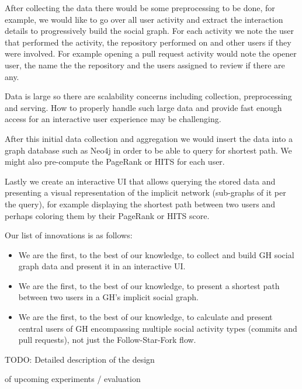 \documentclass[sigconf,11pt]{acmart}
\begin{document}
After collecting the data there would be some preprocessing to be done, for example, we would like to go over all user
activity and extract the interaction details to progressively build the social graph.
For each activity we note the user that performed the activity, the repository performed on and other users if
they were involved.
For example opening a pull request activity would note the opener user, the name the the repository and the users
assigned to review if there are any.

Data is large so there are scalability concerns including collection, preprocessing and serving.
How to properly handle such large data and provide fast enough access for an interactive user experience may be challenging.

After this initial data collection and aggregation we would insert the data into a graph database such as Neo4j\cite{neo4j}
in order to be able to query for shortest path.
We might also pre-compute the PageRank\cite{pagerank} or HITS\cite{hits} for each user.

Lastly we create an interactive UI that allows querying the stored data and presenting a visual representation of the implicit
network (sub-graphs of it per the query), for example displaying the shortest path between two users and perhaps coloring
them by their PageRank or HITS score.

Our list of innovations is as follows:

\begin{itemize}
    \item We are the first, to the best of our knowledge, to collect and build GH social graph data and present it in an interactive UI.
    \item We are the first, to the best of our knowledge, to present a shortest path between two users in a GH's implicit social graph.
    \item We are the first, to the best of our knowledge, to calculate and present central users of GH
      encompassing multiple social activity types (commits and pull requests), not just the Follow-Star-Fork flow.
\end{itemize}

\colorbox{green!30}{TODO: Detailed description of the design}

\colorbox{green!30}{of upcoming experiments / evaluation}

\end{document}
